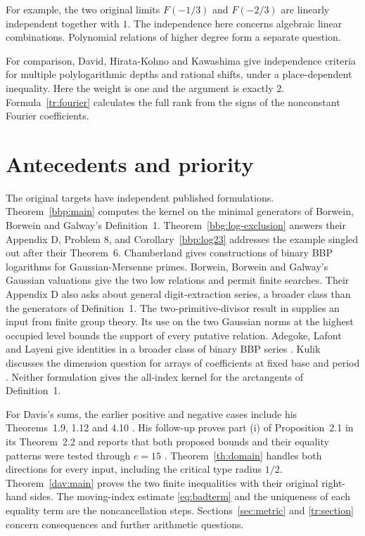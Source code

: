 \documentclass[11pt]{article}
\begin{document}
For example, the two original limits $F(-1/3)$ and $F(-2/3)$
are linearly independent together with $1$. The independence here
concerns algebraic linear combinations. Polynomial relations of
higher degree form a separate question.

For comparison, David, Hirata-Kohno and Kawashima \cite[Theorem~2.1]{DHK} give independence criteria for multiple polylogarithmic depths and rational shifts, under a place-dependent inequality. Here the weight is one and the argument is exactly $2$. Formula~\eqref{tr:fourier} calculates the full rank from the signs of the nonconstant Fourier coefficients.

\section{Antecedents and priority}\label{sec:priority}
The original targets have independent published formulations. Theorem~\ref{bbp:main} computes the kernel on the minimal generators of Borwein, Borwein and Galway's Definition~1. Theorem~\ref{bbg:log-exclusion} answers their Appendix D, Problem 8, and Corollary~\ref{bbp:log23} addresses the example singled out after their Theorem~6. Chamberland \cite{Ch} gives constructions of binary BBP logarithms for Gaussian-Mersenne primes. Borwein, Borwein and Galway's Gaussian valuations give the two low relations and permit finite searches. Their Appendix D also asks about general digit-extraction series, a broader class than the generators of Definition~1. The two-primitive-divisor result in \cite{AKNOT,Grech} supplies an input from finite group theory. Its use on the two Gaussian norms at the highest occupied level bounds the support of every putative relation. Adegoke, Lafont and Layeni give identities in a broader class of binary BBP series \cite{ALL}. Kulik discusses the dimension question for arrays of coefficients at fixed base and period \cite{Kulik}. Neither formulation gives the all-index kernel for the arctangents of Definition~1.

For Davis's sums, the earlier positive and negative cases include his Theorems~1.9, 1.12 and 4.10 \cite{Davis12}. His follow-up proves part (i) of Proposition~2.1 in its Theorem~2.2 and reports that both proposed bounds and their equality patterns were tested through $e=15$ \cite{Davis14}. Theorem~\ref{th:domain} handles both directions for every input, including the critical type radius $1/2$. Theorem~\ref{dav:main} proves the two finite inequalities with their original right-hand sides. The moving-index estimate \eqref{eq:badterm} and the uniqueness of each equality term are the noncancellation steps. Sections~\ref{sec:metric} and \ref{tr:section} concern consequences and further arithmetic questions.
\end{document}
